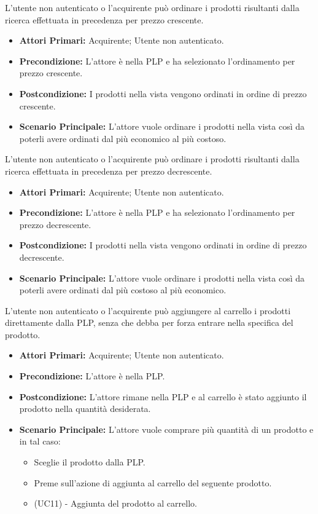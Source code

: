 
L'utente non autenticato o l'acquirente può ordinare i prodotti risultanti dalla ricerca effettuata in precedenza per prezzo crescente.
\begin{itemize}
    \item \textbf{Attori Primari:} Acquirente; Utente non autenticato.
    \item \textbf{Precondizione:} L'attore è nella PLP e ha selezionato l'ordinamento per prezzo crescente.
    \item \textbf{Postcondizione:} I prodotti nella vista vengono ordinati in ordine di prezzo crescente.
    \item \textbf{Scenario Principale:} L'attore vuole ordinare i prodotti nella vista così da poterli avere ordinati dal più economico al più costoso.
\end{itemize}

L'utente non autenticato o l'acquirente può ordinare i prodotti risultanti dalla ricerca effettuata in precedenza per prezzo decrescente.
\begin{itemize}
    \item \textbf{Attori Primari:} Acquirente; Utente non autenticato.
    \item \textbf{Precondizione:} L'attore è nella PLP e ha selezionato l'ordinamento per prezzo decrescente.
    \item \textbf{Postcondizione:} I prodotti nella vista vengono ordinati in ordine di prezzo decrescente.
    \item \textbf{Scenario Principale:} L'attore vuole ordinare i prodotti nella vista così da poterli avere ordinati dal più costoso al più economico.
\end{itemize}

L'utente non autenticato o l'acquirente può aggiungere al carrello i prodotti direttamente dalla PLP, senza che debba per forza entrare nella  specifica del prodotto.
\begin{itemize}
    \item \textbf{Attori Primari:} Acquirente; Utente non autenticato.
    \item \textbf{Precondizione:} L'attore è nella PLP.
    \item \textbf{Postcondizione:} L'attore rimane nella PLP e al carrello è stato aggiunto il prodotto nella quantità desiderata.
    \item \textbf{Scenario Principale:} L'attore vuole comprare più quantità di un prodotto e in tal caso:
    \begin{itemize}
        \item Sceglie il prodotto dalla PLP.
        \item Preme sull'azione di aggiunta al carrello del seguente prodotto.
        \item (UC11) - Aggiunta del prodotto al carrello.
    \end{itemize}
\end{itemize}
